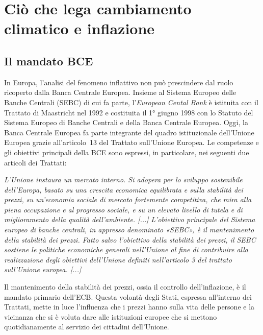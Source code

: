 \chapter{Ciò che lega cambiamento climatico e inflazione}
\label{chp2}

\section{Il mandato BCE}

In Europa, l'analisi del fenomeno inflattivo non può prescindere dal ruolo ricoperto dalla Banca Centrale Europea. Insieme al Sistema Europeo delle Banche Centrali (SEBC) di cui fa parte, l'\textit{European Cental Bank} è istituita con il Trattato di Maastricht nel 1992 e costituita il 1° giugno 1998 con lo Statuto del Sistema Europeo di Banche Centrali e della Banca Centrale Europea. Oggi, la Banca Centrale Europea fa parte integrante del quadro istituzionale dell'Unione Europea grazie all'\mbox{articolo 13} del Trattato sull'Unione Europea. Le competenze e gli obiettivi principali della BCE sono espressi, in particolare, nei seguenti due articoli dei Trattati:

\begin{displayquote}
	\small{}\textit{
		L'Unione instaura un mercato interno. Si adopera per lo sviluppo sostenibile dell'Europa, basato su una crescita economica equilibrata e sulla stabilità dei prezzi, su un'economia sociale di mercato fortemente competitiva, che mira alla piena occupazione e al progresso sociale, e su un elevato livello di tutela e di miglioramento della qualità dell'ambiente. [...]}
	\small{}\textit{
		L'obiettivo principale del Sistema europeo di banche centrali, in appresso denominato «SEBC», è il mantenimento della stabilità dei prezzi. Fatto salvo l'obiettivo della stabilità dei prezzi, il SEBC	sostiene le politiche economiche generali nell'Unione al fine di contribuire alla realizzazione degli obiettivi dell'Unione definiti nell'articolo 3 del trattato sull'Unione europea. [...]}
\end{displayquote}

Il mantenimento della stabilità dei prezzi, ossia il controllo dell'inflazione, è il mandato primario dell'ECB. Questa volontà degli Stati, espressa all'interno dei Trattati, mette in luce l'influenza che i prezzi hanno sulla vita delle persone e la vicinanza che si è voluta dare alle istituzioni europee che si mettono quotidianamente al servizio dei cittadini dell'Unione.

